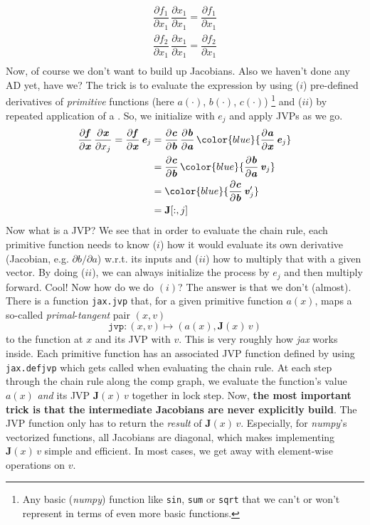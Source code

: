 \documentclass[paper=a4,11pt,headsepline]{scrartcl}
\newcommand{\ve}[1]{\ensuremath{\bm{\mathit{#1}}}}
\newcommand{\ma}[1]{\ensuremath{\bm{\mathbf{#1}}}}
\newcommand{\pd}[2]{\dfrac{\partial #1}{\partial #2}}
\newcommand{\pdi}[2]{\partial #1/\partial #2}
\newcommand{\blue}[1]{{\color{blue}{#1}}}
\newcommand{\soft}[1]{\textsl{#1}\xspace}
\newcommand{\numpy}{\soft{numpy}}
\newcommand{\jax}{\soft{jax}}
\newcommand{\co}[1]{\texttt{#1}}
\begin{document}
\begin{gather*}
    \pd{f_1}{x_1}\,\pd{x_1}{x_1} = \pd{f_1}{x_1} \\
    \pd{f_2}{x_1}\,\pd{x_1}{x_1} = \pd{f_2}{x_1} \\
\end{gather*}
Now, of course we don't want to build up Jacobians. Also we haven't done any AD
yet, have we? The trick is to evaluate the expression by using ($i$)
pre-defined derivatives of \emph{primitive} functions (here $\ve a(\cdot)$,
$\ve b(\cdot)$, $\ve c(\cdot)$)%
\footnote{Any basic (\numpy) function like \co{sin}, \co{sum}
or \co{sqrt} that we can't or won't represent in terms of even more basic
functions.}
and ($ii$) by repeated application of a
\blue{\emph{Jacobian vector product (JVP)}}. So, we initialize with $\ve e_j$
and apply JVPs as we go.
\begin{align*}
    \pd{\ve f}{\ve x}\,\pd{\ve x}{x_j} = \pd{\ve f}{\ve x}\,\ve e_j
        &= \pd{\ve c}{\ve b}\,\pd{\ve b}{\ve a}\,\blue{\pd{\ve a}{\ve x}\,\ve e_j} \\
        &= \pd{\ve c}{\ve b}\,\blue{\pd{\ve b}{\ve a}\,\ve v_j} \\
        &= \blue{\pd{\ve c}{\ve b}\,\ve v_j'} \\
        &= \ma J[:,j]
\end{align*}
Now what is a JVP? We see that in order to evaluate the chain rule, each
primitive function
needs to know ($i$) how it would evaluate its own derivative (Jacobian, e.g.
$\pdi{\ve b}{\ve a}$) w.r.t. its inputs and ($ii$) how to multiply that with a
given vector. By doing ($ii$), we can always initialize the process by $\ve
e_j$ and then multiply forward. Cool! Now how do we do $(i)$? The answer is
that we don't (almost). There is a function \co{jax.jvp} that, for a given
primitive function $\ve a(\ve x)$, maps a so-called
\emph{primal}-\emph{tangent} pair $(\ve x, \ve v)$
\begin{equation*}
    \co{jvp}: (\ve x, \ve v) \mapsto \left(\ve a(\ve x), \ma J(\ve x)\,\ve v\right)
\end{equation*}
to the function at $\ve x$ and its JVP with $\ve v$. This is very roughly how
\jax works inside. Each primitive function has an associated
JVP function defined by using \co{jax.defjvp} which gets called when evaluating
the chain rule.
At each step through the chain rule along the comp graph, we evaluate the
function's value $\ve a(\ve x)$ \emph{and} its JVP $\ma J(\ve x)\,\ve v$
together in lock step.
Now, \textbf{the most important trick is that the intermediate
Jacobians are never explicitly build}. The JVP function only has to return the
\emph{result} of $\ma J(\ve x)\,\ve v$. Especially, for \numpy's vectorized
functions, all Jacobians are diagonal, which makes implementing $\ma J(\ve x)\,\ve v$
simple and efficient. In most cases, we get away with element-wise operations
on \ve v.
\end{document}

